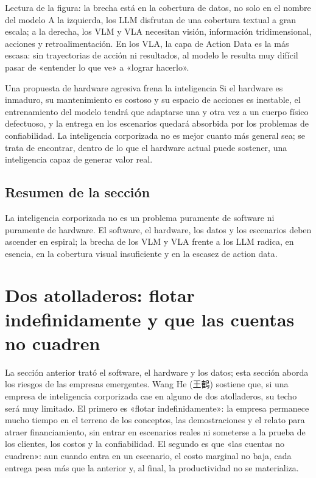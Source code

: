 \documentclass[a4paper]{article}
\begin{document}
\begin{knowledgebox}{Lectura de la figura: la brecha está en la cobertura de datos, no solo en el nombre del modelo}
A la izquierda, los LLM disfrutan de una cobertura textual a gran escala; a la derecha, los VLM y VLA necesitan visión, información tridimensional, acciones y retroalimentación. En los VLA, la capa de Action Data es la más escasa: sin trayectorias de acción ni resultados, al modelo le resulta muy difícil pasar de «entender lo que ve» a «lograr hacerlo».
\end{knowledgebox}

\begin{warningbox}{Una propuesta de hardware agresiva frena la inteligencia}
Si el hardware es inmaduro, su mantenimiento es costoso y su espacio de acciones es inestable, el entrenamiento del modelo tendrá que adaptarse una y otra vez a un cuerpo físico defectuoso, y la entrega en los escenarios quedará absorbida por los problemas de confiabilidad. La inteligencia corporizada no es mejor cuanto más general sea; se trata de encontrar, dentro de lo que el hardware actual puede sostener, una inteligencia capaz de generar valor real.
\end{warningbox}

\subsection{Resumen de la sección}

La inteligencia corporizada no es un problema puramente de software ni puramente de hardware. El software, el hardware, los datos y los escenarios deben ascender en espiral; la brecha de los VLM y VLA frente a los LLM radica, en esencia, en la cobertura visual insuficiente y en la escasez de action data.
\section{Dos atolladeros: flotar indefinidamente y que las cuentas no cuadren}

La sección anterior trató el software, el hardware y los datos; esta sección aborda los riesgos de las empresas emergentes. Wang He (王鹤) sostiene que, si una empresa de inteligencia corporizada cae en alguno de dos atolladeros, su techo será muy limitado. El primero es «flotar indefinidamente»: la empresa permanece mucho tiempo en el terreno de los conceptos, las demostraciones y el relato para atraer financiamiento, sin entrar en escenarios reales ni someterse a la prueba de los clientes, los costos y la confiabilidad. El segundo es que «las cuentas no cuadren»: aun cuando entra en un escenario, el costo marginal no baja, cada entrega pesa más que la anterior y, al final, la productividad no se materializa.
\end{document}
